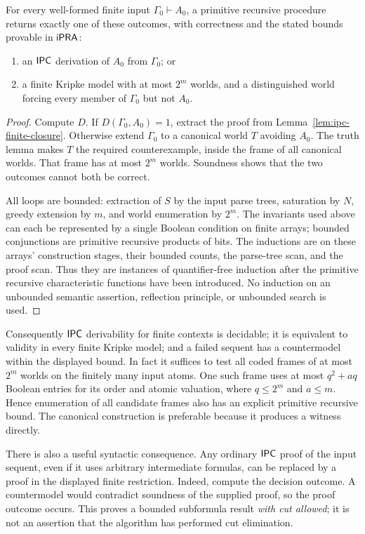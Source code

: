 \begin{theorem}
\label{thm:ipc-proof-or-model}
For every well-formed finite input $\Gamma_0\vdash A_0$, a primitive recursive
procedure returns exactly one of these outcomes, with correctness and the
stated bounds provable in $\mathsf{iPRA}$:
\begin{enumerate}
\item an $\mathsf{IPC}$ derivation of $A_0$ from $\Gamma_0$; or
\item a finite Kripke model with at most $2^m$ worlds, and a distinguished
world forcing every member of $\Gamma_0$ but not $A_0$.
\end{enumerate}
\end{theorem}
\begin{proof}
Compute $D$. If $D(\Gamma_0,A_0)=1$, extract the proof from
Lemma~\ref{lem:ipc-finite-closure}. Otherwise extend $\Gamma_0$ to a
canonical world $T$ avoiding $A_0$. The truth lemma makes $T$ the required
counterexample, inside the frame of all canonical worlds. That frame has
at most $2^m$ worlds. Soundness shows that the two outcomes cannot both be
correct.

All loops are bounded: extraction of $S$ by the input parse trees, saturation
by $N$, greedy extension by $m$, and world enumeration by $2^m$. The
invariants used above can each be represented by a single Boolean condition
on finite arrays; bounded conjunctions are primitive recursive products of
bits. The inductions are on these arrays' construction stages, their bounded
counts, the parse-tree scan, and the proof scan. Thus they are instances of
quantifier-free induction after the primitive recursive characteristic
functions have been introduced. No induction on an unbounded semantic
assertion, reflection principle, or unbounded search is used.
\end{proof}

Consequently $\mathsf{IPC}$ derivability for finite contexts is decidable; it is
equivalent to validity in every finite Kripke model; and a failed sequent
has a countermodel within the displayed bound. In fact it suffices to test
all coded frames of at most $2^m$ worlds on the finitely many input atoms.
One such frame uses at most $q^2+aq$ Boolean entries for its order and atomic
valuation, where $q\leq2^m$ and $a\leq m$. Hence enumeration of all candidate
frames also has an explicit primitive recursive bound. The canonical
construction is preferable because it produces a witness directly.

There is also a useful syntactic consequence. Any ordinary $\mathsf{IPC}$ proof
of the input sequent, even if it uses arbitrary intermediate formulas,
can be replaced by a proof in the displayed finite restriction. Indeed,
compute the decision outcome. A countermodel would contradict soundness
of the supplied proof, so the proof outcome occurs. This proves a bounded
subformula result \emph{with cut allowed}; it is not an assertion that the
algorithm has performed cut elimination.

